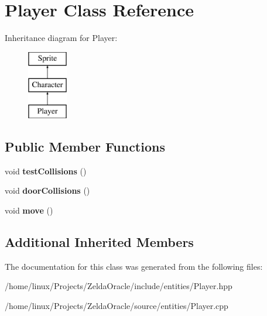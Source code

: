 \hypertarget{classPlayer}{\section{Player Class Reference}
\label{classPlayer}
}
Inheritance diagram for Player\+:\begin{figure}[H]
\begin{center}
\leavevmode
\includegraphics[height=3.000000cm]{classPlayer}
\end{center}
\end{figure}
\subsection*{Public Member Functions}
\begin{DoxyCompactItemize}
\item 
\hypertarget{classPlayer_a23d57e9f0d726e7510c911cc22c08eda}{void {\bfseries test\+Collisions} ()}\label{classPlayer_a23d57e9f0d726e7510c911cc22c08eda}

\item 
\hypertarget{classPlayer_a950759ed42b270061fb1e546ba4fa891}{void {\bfseries door\+Collisions} ()}\label{classPlayer_a950759ed42b270061fb1e546ba4fa891}

\item 
\hypertarget{classPlayer_ae02ee46d8c20dd0697b975f935b09839}{void {\bfseries move} ()}\label{classPlayer_ae02ee46d8c20dd0697b975f935b09839}

\end{DoxyCompactItemize}
\subsection*{Additional Inherited Members}


The documentation for this class was generated from the following files\+:\begin{DoxyCompactItemize}
\item 
/home/linux/\+Projects/\+Zelda\+Oracle/include/entities/Player.\+hpp\item 
/home/linux/\+Projects/\+Zelda\+Oracle/source/entities/Player.\+cpp\end{DoxyCompactItemize}
